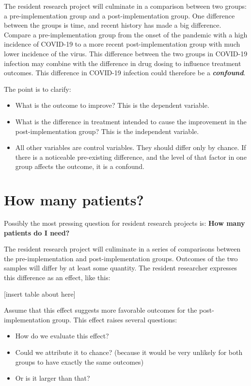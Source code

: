 \documentclass[
]{report}
\providecommand{\tightlist}{%
  \setlength{\itemsep}{0pt}\setlength{\parskip}{0pt}}
\begin{document}
The resident research project will culminate in a comparison between two
groups: a pre-implementation group and a post-implementation group. One
difference between the groups is time, and recent history has made a big
difference. Compare a pre-implementation group from the onset of the
pandemic with a high incidence of COVID-19 to a more recent
post-implementation group with much lower incidence of the virus. This
difference between the two groups in COVID-19 infection may combine with
the difference in drug dosing to influence treatment outcomes. This
difference in COVID-19 infection could therefore be a
\emph{\textbf{confound}}.

The point is to clarify:

\begin{itemize}
\tightlist
\item
  What is the outcome to improve? This is the dependent variable.
\item
  What is the difference in treatment intended to cause the improvement
  in the post-implementation group? This is the independent variable.
\item
  All other variables are control variables. They should differ only by
  chance. If there is a noticeable pre-existing difference, and the
  level of that factor in one group affects the outcome, it is a
  confound.
\end{itemize}

\hypertarget{how-many-patients}{%
\section{How many patients?}\label{how-many-patients}}

Possibly the most pressing question for resident research projects is:
\textbf{How many patients do I need?}

The resident research project will culiminate in a series of comparisons
between the pre-implementation and post-implementation groups. Outcomes
of the two samples will differ by at least some quantity. The resident
researcher expresses this difference as an effect, like this:

{[}insert table about here{]}

Assume that this effect suggests more favorable outcomes for the
post-implementation group. This effect raises several questions:

\begin{itemize}
\tightlist
\item
  How do we evaluate this effect?
\item
  Could we attribute it to chance? (because it would be very unlikely
  for both groups to have exactly the same outcomes)
\item
  Or is it larger than that?
\end{itemize}
\end{document}
